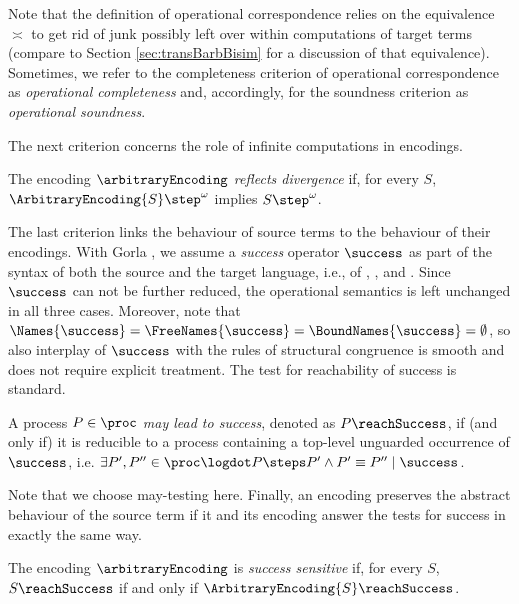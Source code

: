 \documentclass[]{llncs}
\begin{document}
\noindent
Note that the definition of operational correspondence relies on the
equivalence $ \asymp $ to get rid of junk possibly left over within
computations of target terms (compare to Section \ref{sec:transBarbBisim} for a discussion of that equivalence). Sometimes, we refer to the completeness criterion of operational correspondence as \emph{operational completeness} and, accordingly, for the soundness criterion as \emph{operational soundness}.

The next criterion concerns the role of infinite computations in encodings.

\begin{definition}
\label{def:divergenceReflection}
  The encoding $ \arbitraryEncoding $ \emph{reflects divergence} if, for every $ S $, $ \ArbitraryEncoding{S} \step^{\omega} $ implies $ S \step^{\omega} $.
\end{definition}

\noindent
The last criterion links the behaviour of source terms to the behaviour of their encodings.
With Gorla \cite{gorla10}, we assume a \emph{success} operator $ \success $ as part of the syntax of both the source and the target language, i.e., of \piMix, \piSep, and \piAsyn. Since $ \success $ can not be further reduced, the operational semantics is left unchanged in all three cases. Moreover, note that $ \Names{\success} = \FreeNames{\success} = \BoundNames{\success} = \emptyset $, so also interplay of $\success$ with the rules of structural congruence is smooth and does not require explicit treatment. The test for reachability of success is standard.

\begin{definition}[Success]
\label{def:success}
	A process $ P \in \proc $ \emph{may lead to success}, denoted as $ P \reachSuccess $, if (and only if) it is reducible to a process containing a top-level unguarded occurrence of $ \success $, i.e. $ \exists P', P'' \in \proc \logdot P \steps P' \wedge P' \equiv P'' \mid \success $.
\end{definition}

\noindent
Note that we choose may-testing here. Finally, an encoding preserves the abstract behaviour of the source term if it and its encoding answer the tests for success in exactly the same way.

\begin{definition}
\label{def:succesSensitiveness}
  The encoding $ \arbitraryEncoding $ is \emph{success sensitive} if, for every $ S $, $ S \reachSuccess $ if and only if $ \ArbitraryEncoding{S} \reachSuccess $.
\end{definition}
\end{document}
